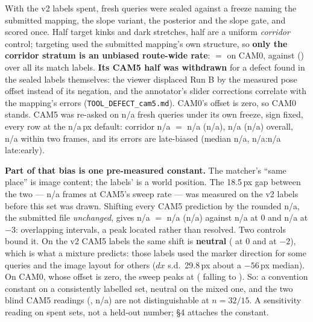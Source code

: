 \documentclass[10pt,a4paper]{article}
\providecommand{\VthreebLabels}{n/a}
\providecommand{\VthreebCamFivePrecision}{n/a}
\providecommand{\VthreebCamFiveWilson}{n/a}
\providecommand{\VthreebCamFiveWithinTwo}{n/a}
\providecommand{\VthreebCorridorCamFive}{n/a}
\providecommand{\VthreebCorridorCamFiveCount}{n/a}
\providecommand{\VthreebCorridorCamFiveWilson}{n/a}
\providecommand{\VthreebSignedMedian}{n/a}
\providecommand{\VthreebSignedLater}{n/a}
\providecommand{\VthreebSignedEarlier}{n/a}
\providecommand{\VthreebPoseDefault}{n/a}
\providecommand{\ConventionConstantFrames}{n/a}
\providecommand{\ConventionShiftFrames}{n/a}
\providecommand{\ConventionShiftedCount}{n/a}
\providecommand{\ConventionShiftedPrecision}{n/a}
\providecommand{\ConventionShiftedWilson}{n/a}
\providecommand{\ConventionUnshiftedPrecision}{n/a}
\providecommand{\ConventionShiftedAtThree}{n/a}
\begin{document}
With the v2 labels spent, \VthreeLabels{} fresh queries were sealed against a
freeze naming the submitted mapping, the slope variant, the posterior and the
slope gate, and scored once. Half target kinks and dark stretches, half are a
uniform \emph{corridor} control; targeting used the submitted mapping's own
structure, so \textbf{only the corridor stratum is an unbiased route-wide rate}: \VthreeCorridorCamZeroCount{} $=$ \VthreeCorridorCamZero{} on CAM0,
against \VthreeCamZeroPrecision{} (\VthreeCamZeroWilson{}) over all its match
labels. \textbf{Its CAM5 half was withdrawn} for a defect found in the sealed
labels themselves: the viewer displaced Run B by the measured pose offset instead
of its negation, and the annotator's slider corrections correlate with the
mapping's errors (\texttt{TOOL\_DEFECT\_cam5.md}). CAM0's offset is zero, so
CAM0 stands. CAM5 was re-asked on \VthreebLabels{} fresh queries under its own
freeze, sign fixed, every row at the \VthreebPoseDefault{}\,px default:
corridor \VthreebCorridorCamFiveCount{} $=$ \VthreebCorridorCamFive{}
(\VthreebCorridorCamFiveWilson{}), \VthreebCamFivePrecision{}
(\VthreebCamFiveWilson{}) overall, \VthreebCamFiveWithinTwo{} within two
frames, and its errors are late-biased (median \VthreebSignedMedian{},
\VthreebSignedLater{}:\VthreebSignedEarlier{} late:early).

\textbf{Part of that bias is one pre-measured constant.} The matcher's ``same
place'' is image content; the labels' is a world position. The 18.5\,px gap
between the two --- \ConventionConstantFrames{} frames at CAM5's sweep rate ---
was measured on the v2 labels before this set was drawn. Shifting every CAM5
prediction by the rounded \ConventionShiftFrames{}, the submitted file
\emph{unchanged}, gives \ConventionShiftedCount{} $=$
\ConventionShiftedPrecision{} (\ConventionShiftedWilson{}) against
\ConventionUnshiftedPrecision{} at $0$ and \ConventionShiftedAtThree{} at $-3$:
overlapping intervals, a peak located rather than resolved. Two controls bound
it. On the v2 CAM5 labels the same shift is \textbf{neutral}
(\ConventionVtwoCamFiveAtZeroPrecision{} at $0$ and at $-2$), which is what a
mixture predicts: those labels used the marker direction for some queries and
the image layout for others ($dx$ s.d.\ 29.8\,px about a $-56$\,px median). On
CAM0, whose offset is zero, the sweep peaks at \ConventionVthreeCamZeroPeak{}
(\ConventionVthreeCamZeroAtZero{} falling to \ConventionVthreeCamZeroAtTwo{}).
So: a convention constant on a consistently labelled set, neutral on the mixed
one, and the two blind CAM5 readings (\VthreebVtwoPrecision{},
\VthreebCorridorCamFive{}) are not distinguishable at $n{=}32/15$. A sensitivity
reading on spent sets, not a held-out number; \S4 attaches the constant.
\end{document}
